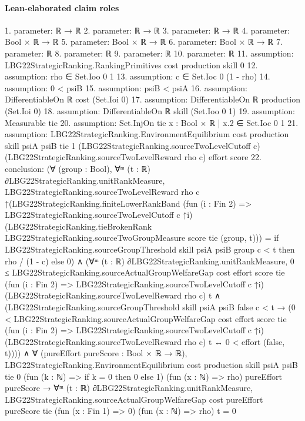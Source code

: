 \documentclass[10pt]{article}
\begin{document}
\paragraph{Lean-elaborated claim roles}\begin{ReviewVerbatim}
1. parameter: ℝ → ℝ
2. parameter: ℝ → ℝ
3. parameter: ℝ → ℝ
4. parameter: Bool × ℝ → ℝ
5. parameter: Bool × ℝ → ℝ
6. parameter: Bool × ℝ → ℝ
7. parameter: ℝ
8. parameter: ℝ
9. parameter: ℝ
10. parameter: ℝ
11. assumption: LBG22StrategicRanking.RankingPrimitives cost production skill 0
12. assumption: rho ∈ Set.Ioo 0 1
13. assumption: c ∈ Set.Ioc 0 (1 - rho)
14. assumption: 0 < psiB
15. assumption: psiB < psiA
16. assumption: DifferentiableOn ℝ cost (Set.Ioi 0)
17. assumption: DifferentiableOn ℝ production (Set.Ioi 0)
18. assumption: DifferentiableOn ℝ skill (Set.Ioo 0 1)
19. assumption: Measurable tie
20. assumption: Set.InjOn tie {x : Bool × ℝ | x.2 ∈ Set.Ioc 0 1}
21. assumption: LBG22StrategicRanking.EnvironmentEquilibrium cost production skill psiA psiB tie 1
  (LBG22StrategicRanking.sourceTwoLevelCutoff c) (LBG22StrategicRanking.sourceTwoLevelReward rho c) effort score
22. conclusion: (∀ (group : Bool),
    ∀ᵐ (t : ℝ) ∂LBG22StrategicRanking.unitRankMeasure,
      LBG22StrategicRanking.sourceTwoLevelReward rho c
          ↑(LBG22StrategicRanking.finiteLowerRankBand
              (fun (i : Fin 2) => LBG22StrategicRanking.sourceTwoLevelCutoff c ↑i)
              (LBG22StrategicRanking.tieBrokenRank LBG22StrategicRanking.sourceTwoGroupMeasure score tie (group, t))) =
        if LBG22StrategicRanking.sourceGroupThreshold skill psiA psiB group c < t then rho / (1 - c) else 0) ∧
  (∀ᵐ (t : ℝ) ∂LBG22StrategicRanking.unitRankMeasure,
      0 ≤
          LBG22StrategicRanking.sourceActualGroupWelfareGap cost effort score tie
            (fun (i : Fin 2) => LBG22StrategicRanking.sourceTwoLevelCutoff c ↑i)
            (LBG22StrategicRanking.sourceTwoLevelReward rho c) t ∧
        (LBG22StrategicRanking.sourceGroupThreshold skill psiA psiB false c < t →
          (0 <
              LBG22StrategicRanking.sourceActualGroupWelfareGap cost effort score tie
                (fun (i : Fin 2) => LBG22StrategicRanking.sourceTwoLevelCutoff c ↑i)
                (LBG22StrategicRanking.sourceTwoLevelReward rho c) t ↔
            0 < effort (false, t)))) ∧
    ∀ (pureEffort pureScore : Bool × ℝ → ℝ),
      LBG22StrategicRanking.EnvironmentEquilibrium cost production skill psiA psiB tie 0
          (fun (k : ℕ) => if k = 0 then 0 else 1) (fun (x : ℕ) => rho) pureEffort pureScore →
        ∀ᵐ (t : ℝ) ∂LBG22StrategicRanking.unitRankMeasure,
          LBG22StrategicRanking.sourceActualGroupWelfareGap cost pureEffort pureScore tie (fun (x : Fin 1) => 0)
              (fun (x : ℕ) => rho) t =
            0
\end{ReviewVerbatim}
\end{document}
